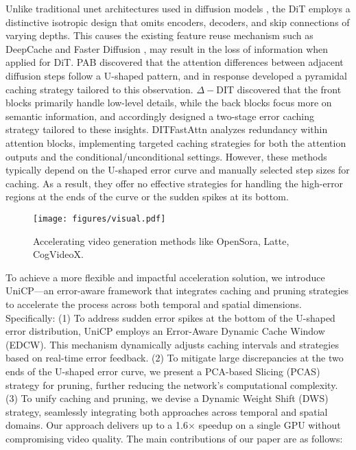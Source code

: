 Unlike traditional unet architectures used in diffusion models \cite{ho2020denoising,song2020denoising}, the DiT employs a distinctive isotropic design that omits encoders, decoders, and skip connections of varying depths.
This causes the existing feature reuse mechanism such as DeepCache \cite{ma2023deepcache} and Faster Diffusion \cite{li2023faster}, may result in the loss of information when applied for DiT. PAB \cite{zhao2024pab} discovered that the attention differences between adjacent diffusion steps follow a U-shaped pattern, and in response developed a pyramidal caching strategy tailored to this observation. $\Delta-$DIT \cite{chen2024delta} discovered that the front blocks primarily handle low-level details, while the back blocks focus more on semantic information, and accordingly designed a two-stage error caching strategy tailored to these insights. DITFastAttn \cite{yuan2024ditfastattn} analyzes redundancy within attention blocks, implementing targeted caching strategies for both the attention outputs and the conditional/unconditional settings. However, these methods typically depend on the U-shaped error curve and manually selected step sizes for caching. As a result, they offer no effective strategies for handling the high-error regions at the ends of the curve or the sudden spikes at its bottom.
\begin{figure}
    \centering
    \texttt{[image: figures/visual.pdf]}
    \caption{Accelerating video generation methods like OpenSora, Latte, CogVideoX.}
    \label{fig:visual}
    \vspace{-7mm}
\end{figure}
To achieve a more flexible and impactful acceleration solution, we introduce UniCP—an error-aware framework that integrates caching and pruning strategies to accelerate the process across both temporal and spatial dimensions. Specifically: (1) To address sudden error spikes at the bottom of the U-shaped error distribution, UniCP employs an Error-Aware Dynamic Cache Window (EDCW). This mechanism dynamically adjusts caching intervals and strategies based on real-time error feedback. (2) To mitigate large discrepancies at the two ends of the U-shaped error curve, we present a PCA-based Slicing (PCAS) strategy for pruning, further reducing the network’s computational complexity. (3) To unify caching and pruning, we devise a Dynamic Weight Shift (DWS) strategy, seamlessly integrating both approaches across temporal and spatial domains. Our approach delivers up to a 1.6× speedup on a single GPU without compromising video quality. The main contributions of our paper are as follows:

